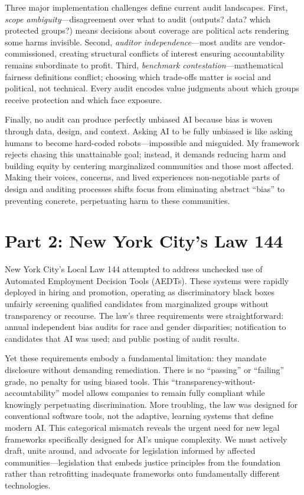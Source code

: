 \documentclass[12pt,twoside]{article}
\begin{document}
Three major implementation challenges define current audit landscapes. First, \textit{scope ambiguity}—disagreement over what to audit (outputs? data? which protected groups?) means decisions about coverage are political acts rendering some harms invisible. Second, \textit{auditor independence}—most audits are vendor-commissioned, creating structural conflicts of interest ensuring accountability remains subordinate to profit. Third, \textit{benchmark contestation}—mathematical fairness definitions conflict; choosing which trade-offs matter is social and political, not technical. Every audit encodes value judgments about which groups receive protection and which face exposure.

Finally, no audit can produce perfectly unbiased AI because bias is woven through data, design, and context. Asking AI to be fully unbiased is like asking humans to become hard-coded robots—impossible and misguided. My framework rejects chasing this unattainable goal; instead, it demands reducing harm and building equity by centering marginalized communities and those most affected. Making their voices, concerns, and lived experiences non-negotiable parts of design and auditing processes shifts focus from eliminating abstract ``bias'' to preventing concrete, perpetuating harm to these communities.

\section{Part 2: New York City's Law 144}

New York City's Local Law 144 attempted to address unchecked use of Automated Employment Decision Tools (AEDTs). These systems were rapidly deployed in hiring and promotion, operating as discriminatory black boxes unfairly screening qualified candidates from marginalized groups without transparency or recourse. The law's three requirements were straightforward: annual independent bias audits for race and gender disparities; notification to candidates that AI was used; and public posting of audit results.

Yet these requirements embody a fundamental limitation: they mandate disclosure without demanding remediation. There is no ``passing'' or ``failing'' grade, no penalty for using biased tools. This ``transparency-without-accountability'' model allows companies to remain fully compliant while knowingly perpetuating discrimination. More troubling, the law was designed for conventional software tools, not the adaptive, learning systems that define modern AI. This categorical mismatch reveals the urgent need for new legal frameworks specifically designed for AI's unique complexity. We must actively draft, unite around, and advocate for legislation informed by affected communities—legislation that embeds justice principles from the foundation rather than retrofitting inadequate frameworks onto fundamentally different technologies.
\end{document}
